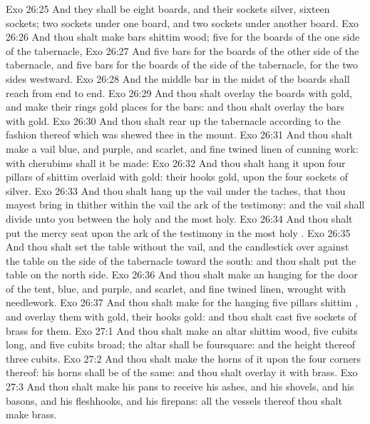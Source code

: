 \vs Exo 26:25 And they shall be eight boards, and their sockets  silver, sixteen sockets; two sockets under one board, and two sockets under another board.
\vs Exo 26:26 And thou shalt make bars  shittim wood; five for the boards of the one side of the tabernacle,
\vs Exo 26:27 And five bars for the boards of the other side of the tabernacle, and five bars for the boards of the side of the tabernacle, for the two sides westward.
\vs Exo 26:28 And the middle bar in the midst of the boards shall reach from end to end.
\vs Exo 26:29 And thou shalt overlay the boards with gold, and make their rings  gold  places for the bars: and thou shalt overlay the bars with gold.
\vs Exo 26:30 And thou shalt rear up the tabernacle according to the fashion thereof which was shewed thee in the mount.
\vs Exo 26:31 And thou shalt make a vail  blue, and purple, and scarlet, and fine twined linen of cunning work: with cherubims shall it be made:
\vs Exo 26:32 And thou shalt hang it upon four pillars of shittim  overlaid with gold: their hooks  gold, upon the four sockets of silver.
\vs Exo 26:33 And thou shalt hang up the vail under the taches, that thou mayest bring in thither within the vail the ark of the testimony: and the vail shall divide unto you between the holy  and the most holy.
\vs Exo 26:34 And thou shalt put the mercy seat upon the ark of the testimony in the most holy .
\vs Exo 26:35 And thou shalt set the table without the vail, and the candlestick over against the table on the side of the tabernacle toward the south: and thou shalt put the table on the north side.
\vs Exo 26:36 And thou shalt make an hanging for the door of the tent,  blue, and purple, and scarlet, and fine twined linen, wrought with needlework.
\vs Exo 26:37 And thou shalt make for the hanging five pillars  shittim , and overlay them with gold,  their hooks  gold: and thou shalt cast five sockets of brass for them.
\vs Exo 27:1 And thou shalt make an altar  shittim wood, five cubits long, and five cubits broad; the altar shall be foursquare: and the height thereof  three cubits.
\vs Exo 27:2 And thou shalt make the horns of it upon the four corners thereof: his horns shall be of the same: and thou shalt overlay it with brass.
\vs Exo 27:3 And thou shalt make his pans to receive his ashes, and his shovels, and his basons, and his fleshhooks, and his firepans: all the vessels thereof thou shalt make  brass.
